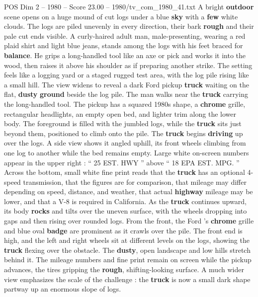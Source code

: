\begin{textsample}{POS Dim 2 – 1980 – Score 23.00 – 1980/tv\_com\_1980\_41.txt}  \label{ex:f2_pos_061}
A bright \textbf{outdoor} scene opens on a huge mound of cut logs under a blue \textbf{sky} with a \textbf{few} white clouds.
The logs are piled unevenly in every direction, their bark \textbf{rough} and their pale cut ends visible.
A curly-haired adult man, male-presenting, wearing a red plaid shirt and light blue jeans, stands among the logs with his feet braced for \textbf{balance}.
He grips a long-handled tool like an axe or pick and works it into the wood, then raises it above his shoulder as if preparing another strike.
The setting feels like a logging yard or a staged rugged test area, with the log pile rising like a small hill.
The view widens to reveal a dark Ford pickup \textbf{truck} waiting on the flat, \textbf{dusty} \textbf{ground} beside the log pile.
The man walks near the \textbf{truck} carrying the long-handled tool.
The pickup has a squared 1980s shape, a \textbf{chrome} grille, rectangular headlights, an empty open bed, and lighter trim along the lower body.
The foreground is filled with the jumbled logs, while the \textbf{truck} sits just beyond them, positioned to climb onto the pile.
The \textbf{truck} begins \textbf{driving} up over the logs.
A side view shows it angled uphill, its front wheels climbing from one log to another while the bed remains empty.
Large white on-screen numbers appear in the upper right : “ 25 EST.
HWY ” above “ 18 EPA EST.
MPG. ” Across the bottom, small white fine print reads that the \textbf{truck} has an optional 4-speed transmission, that the figures are for comparison, that mileage may differ depending on speed, distance, and weather, that actual \textbf{highway} mileage may be lower, and that a V-8 is required in California.
As the \textbf{truck} continues upward, its body \textbf{rocks} and tilts over the uneven surface, with the wheels dropping into gaps and then rising over rounded logs.
From the front, the Ford ’s \textbf{chrome} grille and blue oval \textbf{badge} are prominent as it crawls over the pile.
The front end is high, and the left and right wheels sit at different levels on the logs, showing the \textbf{truck} flexing over the obstacle.
The \textbf{dusty}, open landscape and low hills stretch behind it.
The mileage numbers and fine print remain on screen while the pickup advances, the tires gripping the \textbf{rough}, shifting-looking surface.
A much wider view emphasizes the scale of the challenge : the \textbf{truck} is now a small dark shape partway up an enormous slope of logs.

\end{textsample}
